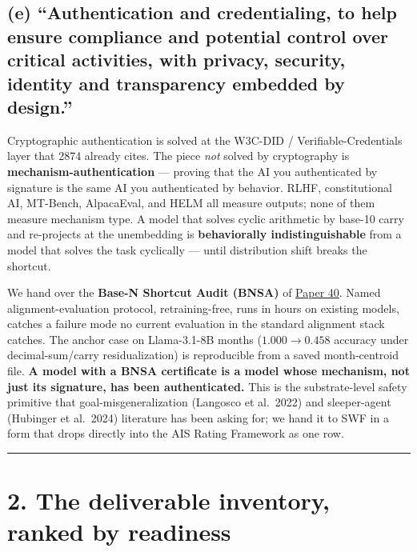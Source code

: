 \documentclass[
  letterpaper,
  11pt]{article}
\newcounter{none} %
\theoremstyle{plain}
\theoremstyle{definition}
\theoremstyle{remark}
\begin{document}
\subsection{(e) ``Authentication and credentialing, to help ensure compliance and potential control over critical activities, with privacy, security, identity and transparency embedded by design.''}\label{e-authentication-and-credentialing-to-help-ensure-compliance-and-potential-control-over-critical-activities-with-privacy-security-identity-and-transparency-embedded-by-design.}

Cryptographic authentication is solved at the W3C-DID / Verifiable-Credentials layer that 2874 already cites. The piece \emph{not} solved by cryptography is \textbf{mechanism-authentication} --- proving that the AI you authenticated by signature is the same AI you authenticated by behavior. RLHF, constitutional AI, MT-Bench, AlpacaEval, and HELM all measure outputs; none of them measure mechanism type. A model that solves cyclic arithmetic by base-10 carry and re-projects at the unembedding is \textbf{behaviorally indistinguishable} from a model that solves the task cyclically --- until distribution shift breaks the shortcut.

We hand over the \textbf{Base-N Shortcut Audit (BNSA)} of \href{C:/Projects/simplicial/40_base_n_shortcut_audit_as_a_safety_primitive.md}{Paper 40}. Named alignment-evaluation protocol, retraining-free, runs in hours on existing models, catches a failure mode no current evaluation in the standard alignment stack catches. The anchor case on Llama-3.1-8B months (\(1.000 \to 0.458\) accuracy under decimal-sum/carry residualization) is reproducible from a saved month-centroid file. \textbf{A model with a BNSA certificate is a model whose mechanism, not just its signature, has been authenticated.} This is the substrate-level safety primitive that goal-misgeneralization (Langosco et al.~2022) and sleeper-agent (Hubinger et al.~2024) literature has been asking for; we hand it to SWF in a form that drops directly into the AIS Rating Framework as one row.

\begin{center}\rule{0.5\linewidth}{0.5pt}\end{center}

\section{2. The deliverable inventory, ranked by readiness}\label{the-deliverable-inventory-ranked-by-readiness}
\end{document}
